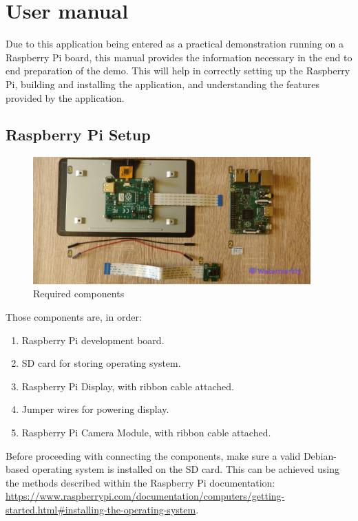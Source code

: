 \appendix
\chapter{User manual}

Due to this application being entered as a practical demonstration running on a Raspberry Pi board, this manual
provides the information necessary in the end to end preparation of the demo. This will help in correctly
setting up the Raspberry Pi, building and installing the application, and understanding the features
provided by the application.

\section{Raspberry Pi Setup}

\begin{figure}[H]
	\includegraphics[width=0.95\textwidth, height=0.5\textwidth]{resources/Manual_Components.jpg}
	\caption{Required components}
\end{figure}

Those components are, in order:
\begin{enumerate}
	\item Raspberry Pi development board.
	\item SD card for storing operating system.
	\item Raspberry Pi Display, with ribbon cable attached.
	\item Jumper wires for powering display.
	\item Raspberry Pi Camera Module, with ribbon cable attached.
\end{enumerate}

Before proceeding with connecting the components, make sure a valid Debian-based operating system is installed
on the SD card. This can be achieved using the methods described within the Raspberry Pi documentation:
\url{https://www.raspberrypi.com/documentation/computers/getting-started.html#installing-the-operating-system}.

